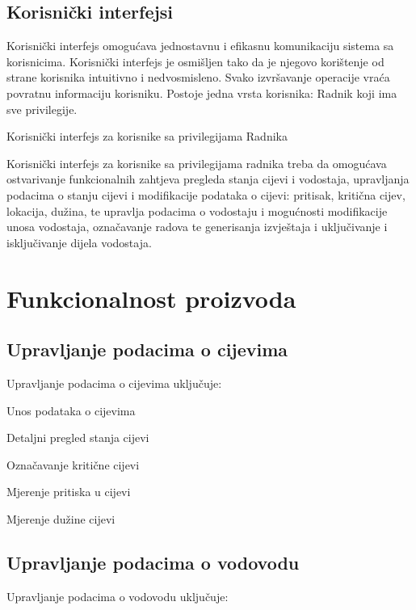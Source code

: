 \documentclass[]{report}
\begin{document}
\subsection{Korisnički interfejsi}
Korisnički interfejs omogućava jednostavnu i efikasnu komunikaciju sistema sa korisnicima. Korisnički interfejs je osmišljen tako da je njegovo korištenje od strane korisnika intuitivno i nedvosmisleno. Svako izvršavanje operacije vraća povratnu informaciju korisniku. Postoje jedna vrsta korisnika:  Radnik koji ima sve  privilegije.
 
 \begin{compactitem}
 \item Korisnički interfejs za korisnike sa privilegijama Radnika  
 
\item Korisnički interfejs za korisnike sa privilegijama radnika treba da omogućava ostvarivanje funkcionalnih zahtjeva pregleda stanja cijevi i vodostaja, upravljanja podacima o stanju cijevi i modifikacije podataka o cijevi: pritisak, kritična cijev, lokacija, dužina, te upravlja podacima o vodostaju i mogućnosti modifikacije unosa vodostaja, označavanje radova te generisanja izvještaja i uključivanje i isključivanje dijela vodostaja.

\end{compactitem}

\section{Funkcionalnost proizvoda}

\subsection{Upravljanje podacima o cijevima}
Upravljanje podacima o cijevima uključuje:

\begin{compactitem}
\item Unos podataka o  cijevima  
\item Detaljni pregled stanja cijevi 
\item Označavanje kritične cijevi
\item Mjerenje pritiska u cijevi
\item Mjerenje dužine cijevi
\end{compactitem}

\subsection{Upravljanje podacima o vodovodu}
Upravljanje podacima o vodovodu uključuje:
\end{document}
